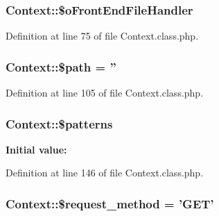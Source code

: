 \hypertarget{classContext_a55e855769152e53af5e2ecb9b889c7f6}{
\subsubsection[{\$o\-Front\-End\-File\-Handler}]{\setlength{\rightskip}{0pt plus 5cm}Context\-::\$o\-Front\-End\-File\-Handler}}\label{classContext_a55e855769152e53af5e2ecb9b889c7f6}


Definition at line 75 of file Context.\-class.\-php.

\hypertarget{classContext_a0752e74e1ec01a4fd63c044a1d3bd28b}{
\subsubsection[{\$path}]{\setlength{\rightskip}{0pt plus 5cm}Context\-::\$path = ''}}\label{classContext_a0752e74e1ec01a4fd63c044a1d3bd28b}


Definition at line 105 of file Context.\-class.\-php.

\hypertarget{classContext_a257fa15929338411949a173ff34ab35d}{
\subsubsection[{\$patterns}]{\setlength{\rightskip}{0pt plus 5cm}Context\-::\$patterns}}\label{classContext_a257fa15929338411949a173ff34ab35d}
{\bfseries Initial value\-:}


Definition at line 146 of file Context.\-class.\-php.

\hypertarget{classContext_a1e80f487f65708456eb17be0024aee50}{
\subsubsection[{\$request\-\_\-method}]{\setlength{\rightskip}{0pt plus 5cm}Context\-::\$request\-\_\-method = 'G\-E\-T'}}\label{classContext_a1e80f487f65708456eb17be0024aee50}


